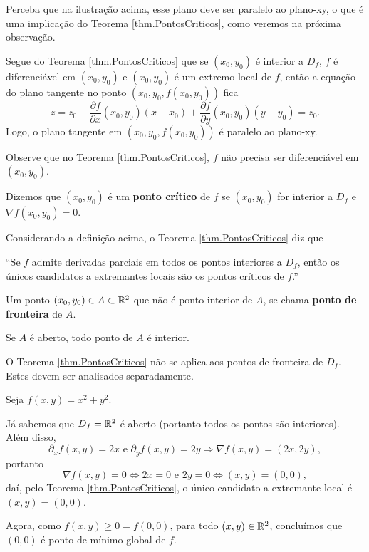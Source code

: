 Perceba que na ilustração acima, esse plano deve ser paralelo ao plano-xy, o que é uma implicação do Teorema \ref{thm.PontosCriticos}, como veremos na próxima observação.

\begin{remark}
    Segue do Teorema \ref{thm.PontosCriticos} que se \((x_0,y_0)\) é interior a \(D_f\), \(f\) é diferenciável em \((x_0,y_0)\) e \((x_0,y_0)\) é um extremo local de \(f\), então a equação do plano tangente no ponto \((x_0,y_0,f(x_0,y_0))\) fica \[z = z_0 + \frac{\partial f}{\partial x}(x_0,y_0) (x-x_0) + \frac{\partial f}{\partial y}(x_0,y_0)(y-y_0) = z_0.\] Logo, o plano tangente em \((x_0,y_0,f(x_0,y_0))\) é paralelo ao plano-xy.

    Observe que no Teorema \ref{thm.PontosCriticos}, \(f\) não precisa ser diferenciável em \((x_0,y_0)\).
\end{remark}

\begin{definition}
    Dizemos que \((x_0,y_0)\) é um \textbf{ponto crítico}\label{Ponto Crítico} de \(f\) se \((x_0,y_0)\) for interior a \(D_f\) e \(\nabla f(x_0,y_0) = 0\).
\end{definition}

\begin{remark}
    Considerando a definição acima, o Teorema \ref{thm.PontosCriticos} diz que

    ``Se \(f\) admite derivadas parciais em todos os pontos interiores a \(D_f\), então os únicos candidatos a extremantes locais são os pontos críticos de \(f\).''
\end{remark}

\begin{definition}
    Um ponto \((x_0,y_0)\in A\subset\mathbb{R}^2\) que não é ponto interior de \(A\), se chama \textbf{ponto de fronteira}\label{Ponto de fronteira} de \(A\).
\end{definition}

\begin{remark}
    Se \(A\) é aberto, todo ponto de \(A\) é interior.
\end{remark}

\begin{remark}
    O Teorema \ref{thm.PontosCriticos} não se aplica aos pontos de fronteira de \(D_f\). Estes devem ser analisados separadamente.
\end{remark}

\begin{example}
    Seja \(f(x,y) = x^2 + y^2\).

    Já sabemos que \(D_f = \mathbb{R}^2\) é aberto (portanto todos os pontos são interiores). Além disso, \[\partial_x f(x,y) = 2x \text{ e } \partial_y f(x,y) = 2y \Rightarrow \nabla f(x,y) = (2x,2y),\] portanto \[\nabla f(x,y) = 0 \Leftrightarrow 2x =0 \text{ e } 2y = 0 \Leftrightarrow (x,y) = (0,0),\] daí, pelo Teorema \ref{thm.PontosCriticos}, o único candidato a extremante local é \((x,y) = (0,0)\).

    Agora, como \(f(x,y) \geq 0 = f(0,0)\), para todo \((x,y)\in\mathbb{R}^2\), concluímos que \((0,0)\) é ponto de mínimo global de \(f\).
\end{example}

